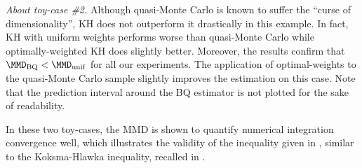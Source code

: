 \smallskip
\noindent\emph{About toy-case \#2.} Although quasi-Monte Carlo is known to suffer the ``curse of dimensionality'', KH does not outperform it drastically in this example. 
In fact, KH with uniform weights performs worse than quasi-Monte Carlo while optimally-weighted KH does slightly better. 
Moreover, the results confirm that $\MMD_{\mathrm{BQ}}< \MMD_{\mathrm{unif}}$ for all our experiments. 
The application of optimal-weights to the quasi-Monte Carlo sample slightly improves the estimation on this case. 
Note that the prediction interval around the BQ estimator is not plotted for the sake of readability. 
\smallskip

In these two toy-cases, the MMD is shown to quantify numerical integration convergence well, which illustrates the validity of the inequality given in , similar to the Koksma-Hlawka inequality, recalled in .

%

